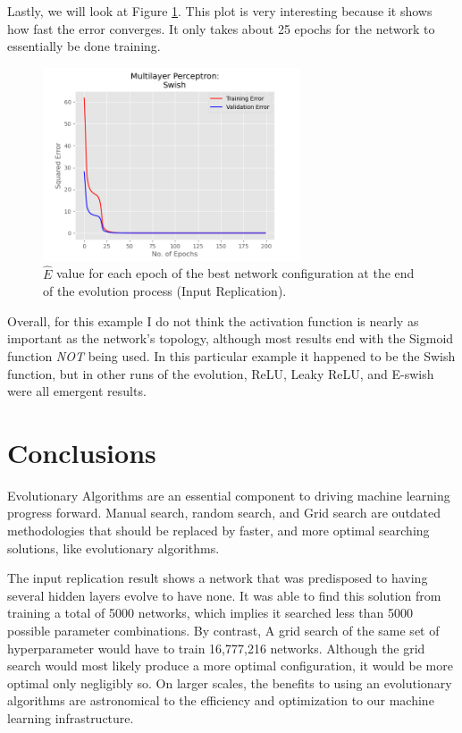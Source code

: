 \documentclass[12pt]{report}
\begin{document}
Lastly, we will look at Figure \ref{replicationerror}.
This plot is very interesting because it shows how fast the error converges. It only takes about 25 epochs for the network to essentially be done training.
\begin{figure}[hbt!]
    \centering
    \includegraphics[width=3in]{figures/23.png}
    \caption{$\hat{E}$ value for each epoch of the best network configuration at the end of the evolution process (Input Replication).}
    \label{replicationerror}
\end{figure}
Overall, for this example I do not think the activation function is nearly as important as the network's topology, although most results end with the Sigmoid function \emph{NOT} being used. In this particular example it happened to be the Swish function, but in other runs of the evolution, ReLU, Leaky ReLU, and E-swish were all emergent results.

\section{Conclusions}
Evolutionary Algorithms are an essential component to driving machine learning progress forward. Manual search, random search, and Grid search are outdated methodologies that should be replaced by faster, and more optimal searching solutions, like evolutionary algorithms.

The input replication result shows a network that was predisposed to having several hidden layers evolve to have none. It was able to find this solution from training a total of 5000 networks, which implies it searched less than 5000 possible parameter combinations. By contrast, A grid search of the same set of hyperparameter would have to train 16,777,216 networks. Although the grid search would most likely produce a more optimal configuration, it would be more optimal only negligibly so. On larger scales, the benefits to using an evolutionary algorithms are astronomical to the efficiency and optimization to our machine learning infrastructure.
\end{document}
